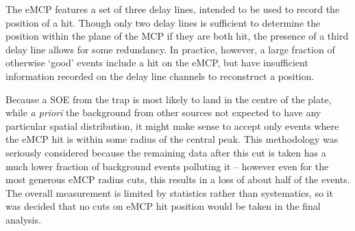 The eMCP features a set of three delay lines, intended to be used to record the position of a hit.
Though only two delay lines is sufficient to determine the position within the plane of the MCP if they are both hit, the presence of a third delay line allows for some redundancy.  In practice, however, a large fraction of otherwise `good' events include a hit on the eMCP, but have insufficient information recorded on the delay line channels to reconstruct a position.  


Because a SOE from the trap is most likely to land in the centre of the plate, while \emph{a priori} the background from other sources not expected to have any particular spatial distribution,  it might make sense to accept only events where the eMCP hit is within some radius of the central peak.  This methodology was seriously considered because the remaining data after this cut is taken has a much lower fraction of background events polluting it -- however even for the most generous eMCP radius cuts, this results in a loss of about half of the events.  The overall measurement is limited by statistics rather than systematics, so it was decided that no cuts on eMCP hit position would be taken in the final analysis.

